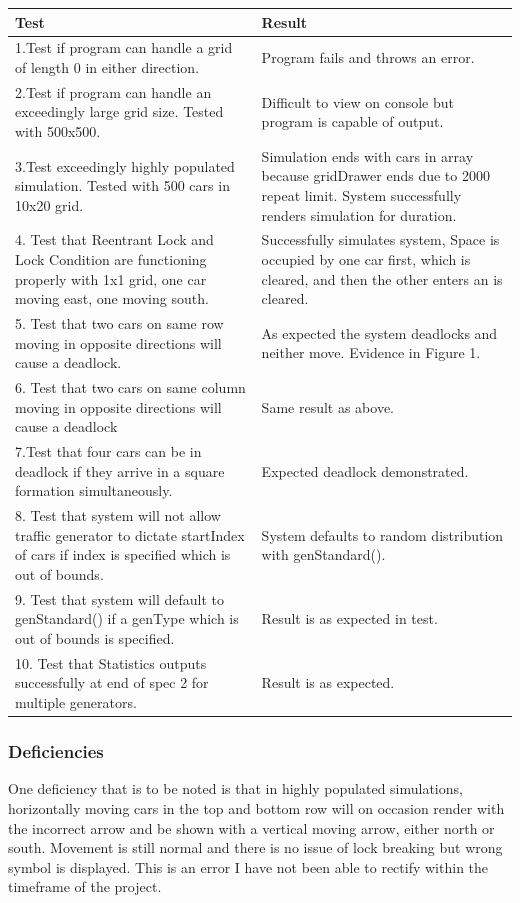 \documentclass[11pt, oneside]{article}
\begin{document}
\begin{center}
\begin{tabular}{ | m{8cm} | m{8cm} | } 
 \hline
Test & Result \\ 
 \hline
 1.Test if program can handle a grid of length 0 in either direction. & Program fails and throws an error. \\ 
 \hline
 2.Test if program can handle an exceedingly large grid size. Tested with 500x500.  & Difficult to view on console but program is capable of output. \\ 
 \hline
 3.Test exceedingly highly populated simulation. Tested with 500 cars in 10x20 grid. & Simulation ends with cars in array because gridDrawer ends due to 2000 repeat limit. System successfully renders simulation for duration. \\
 \hline
 4. Test that Reentrant Lock and Lock Condition are functioning properly with 1x1 grid, one car moving east, one moving south. & Successfully simulates system, Space is occupied by one car first, which is cleared, and then the other enters an is cleared. \\
\hline
5. Test that two cars on same row moving in opposite directions will cause a deadlock. & As expected the system deadlocks and neither move. Evidence in Figure 1. \\
 \hline
6. Test that two cars on same column moving in opposite directions will cause a deadlock & Same result as above.\\
 \hline
7.Test that four cars can be in deadlock if they arrive in a square formation simultaneously. & Expected deadlock demonstrated. \\
 \hline
8. Test that system will not allow traffic generator to dictate startIndex of cars if index is specified which is out of bounds. & System defaults to random distribution with genStandard(). \\
 \hline
9. Test that system will default to genStandard() if a genType which is out of bounds is specified. & Result is as expected in test. \\
 \hline
10. Test that Statistics outputs successfully at end of spec 2 for multiple generators. & Result is as expected. \\
  \hline
\end{tabular}
\end{center}
 
 \subsubsection*{Deficiencies}
 One deficiency that is to be noted is that in highly populated simulations, horizontally moving cars in the top and bottom row will on occasion render with the incorrect arrow and be shown with a vertical moving arrow, either north or south. Movement is still normal and there is no issue of lock breaking but wrong symbol is displayed. This is an error I have not been able to rectify within the timeframe of the project.
\end{document}
